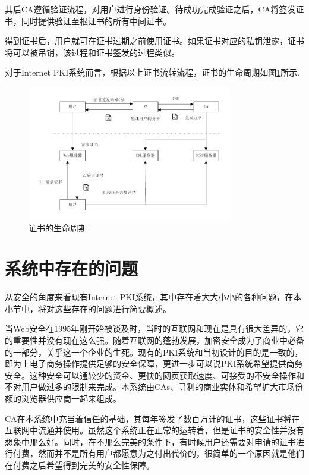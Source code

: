 其后CA遵循验证流程，对用户进行身份验证。待成功完成验证之后，CA将签发证书，同时提供验证至根证书的所有中间证书。

得到证书后，用户就可在证书过期之前使用证书。如果证书对应的私钥泄露，证书将可以被吊销，该过程和证书签发的过程类似。

对于Internet PKI系统而言，根据以上证书流转流程，证书的生命周期如图\ref{fig:cert_lifecycle}所示.

\begin{figure}[htbp]
 	\centering
 	\includegraphics[width = 0.8\textwidth]{img/cert_lifecycle}
 	\caption{证书的生命周期}\label{fig:cert_lifecycle}
\end{figure}

\section{系统中存在的问题}

从安全的角度来看现有Internet PKI系统，其中存在着大大小小的各种问题，在本小节中，将对这些存在的问题进行简要概述。

当Web安全在1995年刚开始被谈及时，当时的互联网和现在是具有很大差异的，它的重要性并没有现在这么强。随着互联网的蓬勃发展，加密安全成为了商业中必备的一部分，关乎这一个企业的生死。现有的PKI系统和当初设计的目的是一致的，即为上电子商务操作提供足够的安全保障，更进一步可以说PKI系统希望提供商务安全。这种安全可以通较少的资金、更快的网页获取速度、可接受的不安全操作和不对用户做过多的限制来完成。本系统由CAs、寻利的商业实体和希望扩大市场份额的浏览器供应商一起来组成。

CA在本系统中充当着信任的基础，其每年签发了数百万计的证书，这些证书将在互联网中流通并使用。虽然这个系统正在正常的运转着，但是证书的安全性并没有想象中那么好。同时，在不那么完美的条件下，有时候用户还需要对申请的证书进行付费，然而并不是所有用户都愿意为之付出代价的，很简单的一个原因就是他们在付费之后希望得到完美的安全性保障。

